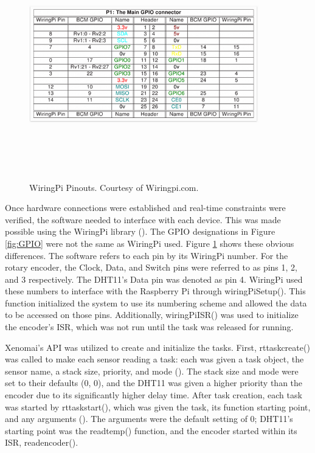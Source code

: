 \documentclass[letterpaper, 12pt]{article}
\begin{document}
\begin{figure}[H]
	\centering
	\includegraphics[width=10cm,height=10cm,keepaspectratio]{pi_pins.png}
	\caption[Pinouts]{WiringPi Pinouts. Courtesy of Wiringpi.com.}
	\label{fig:pinouts}
\end{figure}

\indent Once hardware connections were established and real-time constraints were verified, the software needed to interface with each device.  This was made possible using the WiringPi library (\cite{gordonhenderson2018}).  The GPIO designations in Figure \ref{fig:GPIO} were not the same as WiringPi used.  Figure \ref{fig:pinouts} shows these obvious differences. The software refers to each pin by its WiringPi number.  For the rotary encoder, the Clock, Data, and Switch pins were referred to as pins 1, 2, and 3 respectively.  The DHT11's Data pin was denoted as pin 4.  WiringPi used these numbers to interface with the Raspberry Pi through wiringPiSetup().  This function initialized the system to use its numbering scheme and allowed the data to be accessed on those pins.  Additionally, wiringPiISR() was used to initialize the encoder's ISR, which was not run until the task was released for running.

\indent Xenomai's API was utilized to create and initialize the tasks.  First, rt\textunderscore task\textunderscore create() was called to make each sensor reading a task: each was given a task object, the sensor name, a stack size, priority, and mode (\cite{xenomai2018}).  The stack size and mode were set to their defaults (0, 0), and the DHT11 was given a higher priority than the encoder due to its significantly higher delay time.  After task creation, each task was started by rt\textunderscore task\textunderscore start(), which was given the task, its function starting point, and any arguments (\cite{xenomai2018}).  The arguments were the default setting of 0; DHT11's starting point was the read\textunderscore temp() function, and the encoder started within its ISR, read\textunderscore encoder().
\end{document}
